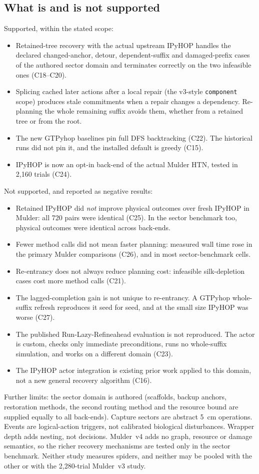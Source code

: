 \subsection{What is and is not supported}
\label{sec:recovery-scope}
Supported, within the stated scope:
\begin{itemize}
  \item Retained-tree recovery with the actual upstream IPyHOP handles the declared changed-anchor,
        detour, dependent-suffix and damaged-prefix cases of the authored sector domain and terminates
        correctly on the two infeasible ones (C18--C20).
  \item Splicing cached later actions after a local repair (the v3-style \texttt{component} scope)
        produces stale commitments when a repair changes a dependency. Re-planning the whole remaining
        suffix avoids them, whether from a retained tree or from the root.
  \item The new GTPyhop baselines pin full DFS backtracking (C22). The historical runs did not pin it,
        and the installed default is greedy (C15).
  \item IPyHOP is now an opt-in back-end of the actual Mulder HTN, tested in 2,160 trials (C24).
\end{itemize}
Not supported, and reported as negative results:
\begin{itemize}
  \item Retained IPyHOP did \emph{not} improve physical outcomes over fresh IPyHOP in Mulder: all 720
        pairs were identical (C25). In the sector benchmark too, physical outcomes were identical across
        back-ends.
  \item Fewer method calls did not mean faster planning: measured wall time rose in the primary Mulder
        comparisons (C26), and in most sector-benchmark cells.
  \item Re-entrancy does not always reduce planning cost: infeasible silk-depletion cases cost more
        method calls (C21).
  \item The lagged-completion gain is not unique to re-entrancy. A GTPyhop whole-suffix refresh
        reproduces it seed for seed, and at the small size IPyHOP was worse (C27).
  \item The published Run-Lazy-Refineahead evaluation is not reproduced. The actor is custom, checks only
        immediate preconditions, runs no whole-suffix simulation, and works on a different domain (C23).
  \item The IPyHOP actor integration is existing prior work applied to this domain, not a new general
        recovery algorithm (C16).
\end{itemize}
Further limits: the sector domain is authored (scaffolds, backup anchors, restoration methods, the
second routing method and the resource bound are supplied equally to all back-ends). Capture sectors are
abstract 5~cm operations. Events are logical-action triggers, not calibrated biological disturbances.
Wrapper depth adds nesting, not decisions. Mulder~v4 adds no graph, resource or damage semantics, so the
richer recovery mechanisms are tested only in the sector benchmark. Neither study measures spiders, and
neither may be pooled with the other or with the 2,280-trial Mulder~v3 study.
